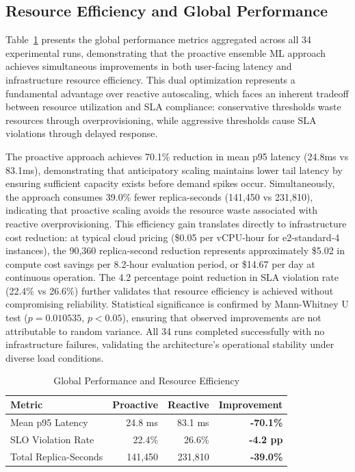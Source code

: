 \documentclass[conference]{IEEEtran}
\begin{document}
\subsection{Resource Efficiency and Global Performance}

Table~\ref{tab:resource-comparison} presents the global performance metrics aggregated across all 34 experimental runs, demonstrating that the proactive ensemble ML approach achieves simultaneous improvements in both user-facing latency and infrastructure resource efficiency. This dual optimization represents a fundamental advantage over reactive autoscaling, which faces an inherent tradeoff between resource utilization and SLA compliance: conservative thresholds waste resources through overprovisioning, while aggressive thresholds cause SLA violations through delayed response.

The proactive approach achieves 70.1\% reduction in mean p95 latency (24.8ms vs 83.1ms), demonstrating that anticipatory scaling maintains lower tail latency by ensuring sufficient capacity exists before demand spikes occur. Simultaneously, the approach consumes 39.0\% fewer replica-seconds (141,450 vs 231,810), indicating that proactive scaling avoids the resource waste associated with reactive overprovisioning. This efficiency gain translates directly to infrastructure cost reduction: at typical cloud pricing (\$0.05 per vCPU-hour for e2-standard-4 instances), the 90,360 replica-second reduction represents approximately \$5.02 in compute cost savings per 8.2-hour evaluation period, or \$14.67 per day at continuous operation. The 4.2 percentage point reduction in SLA violation rate (22.4\% vs 26.6\%) further validates that resource efficiency is achieved without compromising reliability. Statistical significance is confirmed by Mann-Whitney U test ($p = 0.010535$, $p < 0.05$), ensuring that observed improvements are not attributable to random variance. All 34 runs completed successfully with no infrastructure failures, validating the architecture's operational stability under diverse load conditions.

\begin{table}[htbp]
\caption{Global Performance and Resource Efficiency}
\begin{center}
\begin{tabular}{|l|r|r|r|}
\hline
\textbf{Metric} & \textbf{Proactive} & \textbf{Reactive} & \textbf{Improvement} \\
\hline
Mean p95 Latency & 24.8 ms & 83.1 ms & \textbf{-70.1\%} \\
SLO Violation Rate & 22.4\% & 26.6\% & \textbf{-4.2 pp} \\
Total Replica-Seconds & 141,450 & 231,810 & \textbf{-39.0\%} \\
\hline
\end{tabular}
\label{tab:resource-comparison}
\end{center}
\end{table}
\end{document}
